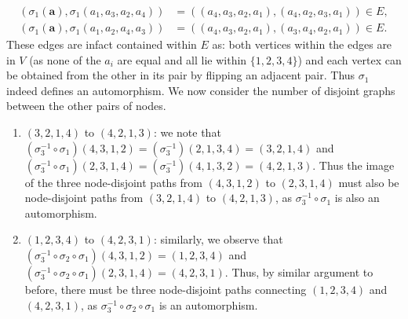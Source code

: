 \begin{parts}
\begin{solution}
\begin{align*}
        (\sigma_1(\bm a), \sigma_1(a_1, a_3, a_2, a_4)) &= ((a_4, a_3, a_2, a_1), (a_4, a_2, a_3, a_1)) \in E, \\
        (\sigma_1(\bm a), \sigma_1(a_1, a_2, a_4, a_3)) &= ((a_4, a_3, a_2, a_1), (a_3, a_4, a_2, a_1)) \in E.
      \end{align*}
      These edges are infact contained within $E$ as: both vertices within the edges are in $V$ (as none of the $a_i$ are equal and all lie within $\{1,2,3,4\}$) and each vertex can be obtained from the other in its pair by flipping an adjacent pair. Thus $\sigma_1$ indeed defines an automorphism.
      We now consider the number of disjoint graphs between the other pairs of nodes.
      \begin{enumerate}
        \item $(3,2,1,4)$ to $(4,2,1,3)$: we note that $(\sigma_3^{-1} \circ \sigma_1)(4,3,1,2) = (\sigma_3^{-1})(2,1,3,4) = (3,2,1,4)$ and $(\sigma_3^{-1} \circ \sigma_1)(2,3,1,4) = (\sigma_3^{-1})(4,1,3,2) = (4,2,1,3)$. Thus the image of the three node-disjoint paths from $(4,3,1,2)$ to $(2,3,1,4)$ must also be node-disjoint paths from $(3,2,1,4)$ to $(4,2,1,3)$, as $\sigma_3^{-1} \circ \sigma_1$ is also an automorphism.
        \item $(1,2,3,4)$ to $(4,2,3,1)$: similarly, we observe that $(\sigma_3^{-1} \circ \sigma_2 \circ \sigma_1)(4,3,1,2) = (1,2,3,4)$ and $(\sigma_3^{-1} \circ \sigma_2 \circ \sigma_1)(2,3,1,4) = (4,2,3,1)$. Thus, by similar argument to before, there must be three node-disjoint paths connecting $(1,2,3,4)$ and $(4,2,3,1)$, as $\sigma_3^{-1} \circ \sigma_2 \circ \sigma_1$ is an automorphism.
      \end{enumerate}
    \end{solution}


\end{parts}
